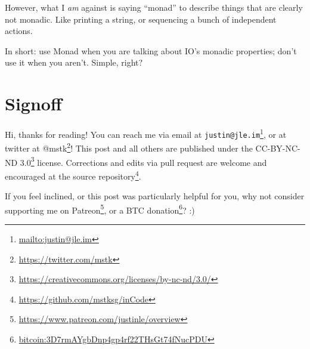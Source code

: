 \documentclass[]{article}
\renewcommand{\href}[2]{#2\footnote{\url{#1}}}
\begin{document}
\begin{itemize}
  However, what I \emph{am} against is saying ``monad'' to describe things that
  are clearly not monadic. Like printing a string, or sequencing a bunch of
  independent actions.

  In short: use Monad when you are talking about IO's monadic properties; don't
  use it when you aren't. Simple, right?
\end{itemize}

\hypertarget{signoff}{%
\section{Signoff}\label{signoff}}

Hi, thanks for reading! You can reach me via email at
\href{mailto:justin@jle.im}{\nolinkurl{justin@jle.im}}, or at twitter at
\href{https://twitter.com/mstk}{@mstk}! This post and all others are published
under the \href{https://creativecommons.org/licenses/by-nc-nd/3.0/}{CC-BY-NC-ND
3.0} license. Corrections and edits via pull request are welcome and encouraged
at \href{https://github.com/mstksg/inCode}{the source repository}.

If you feel inclined, or this post was particularly helpful for you, why not
consider \href{https://www.patreon.com/justinle/overview}{supporting me on
Patreon}, or a \href{bitcoin:3D7rmAYgbDnp4gp4rf22THsGt74fNucPDU}{BTC donation}?
:)
\end{document}
